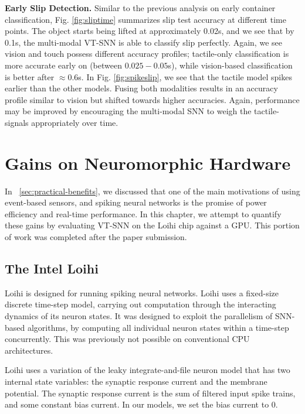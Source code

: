 \documentclass[fyp]{socreport}
\begin{document}
\vspace{0.3em}
\noindent\textbf{Early Slip Detection.} Similar to the previous analysis on
early container classification, Fig. \ref{fig:sliptime} summarizes slip test
accuracy at different time points. The object starts being lifted at
approximately 0.02s, and we see that by 0.1s, the multi-modal VT-SNN is able to
classify slip perfectly. Again, we see vision and touch possess different
accuracy profiles; tactile-only classification is more accurate early on
(between $0.025-0.05$s), while vision-based classification is better after
$\approx 0.6$s. In Fig. \ref{fig:spikeslip}, we see that the tactile model
spikes earlier than the other models. Fusing both modalities results in an
accuracy profile similar to vision but shifted towards higher accuracies. Again,
performance may be improved by encouraging the multi-modal SNN to weigh the
tactile-signals appropriately over time.

\chapter{Gains on Neuromorphic Hardware\label{cha:neuromorphic}}

In ~\autoref{sec:practical-benefits}, we discussed that one of the main
motivations of using event-based sensors, and spiking neural networks is the
promise of power efficiency and real-time performance. In this chapter, we
attempt to quantify these gains by evaluating VT-SNN on the Loihi chip against a
GPU. This portion of work was completed after the paper submission.

\section{The Intel Loihi\cite{davies2018loihi}}

Loihi is designed for running spiking neural networks. Loihi uses a fixed-size
discrete time-step model, carrying out computation through the interacting
dynamics of its neuron states. It was designed to exploit the parallelism of
SNN-based algorithms, by computing all individual neuron states within a
time-step concurrently. This was previously not possible on conventional CPU
architectures.

Loihi uses a variation of the leaky integrate-and-file neuron model that has two
internal state variables: the synaptic response current and the membrane
potential. The synaptic response current is the sum of filtered input spike
trains, and some constant bias current. In our models, we set the bias current
to 0.
\end{document}
